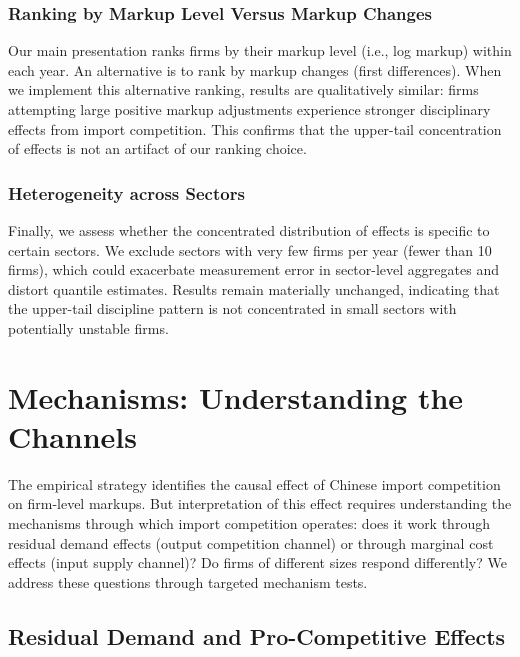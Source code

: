 \documentclass[12pt]{article}
\begin{document}
\subsubsection{Ranking by Markup Level Versus Markup Changes}

Our main presentation ranks firms by their markup level (i.e., log markup) within each year. An alternative is to rank by markup changes (first differences). When we implement this alternative ranking, results are qualitatively similar: firms attempting large positive markup adjustments experience stronger disciplinary effects from import competition. This confirms that the upper-tail concentration of effects is not an artifact of our ranking choice.

\subsubsection{Heterogeneity across Sectors}

Finally, we assess whether the concentrated distribution of effects is specific to certain sectors. We exclude sectors with very few firms per year (fewer than 10 firms), which could exacerbate measurement error in sector-level aggregates and distort quantile estimates. Results remain materially unchanged, indicating that the upper-tail discipline pattern is not concentrated in small sectors with potentially unstable firms.


\section{Mechanisms: Understanding the Channels}

The empirical strategy identifies the causal effect of Chinese import competition on firm-level markups. But interpretation of this effect requires understanding the mechanisms through which import competition operates: does it work through residual demand effects (output competition channel) or through marginal cost effects (input supply channel)? Do firms of different sizes respond differently? We address these questions through targeted mechanism tests.

\subsection{Residual Demand and Pro-Competitive Effects}
\end{document}
